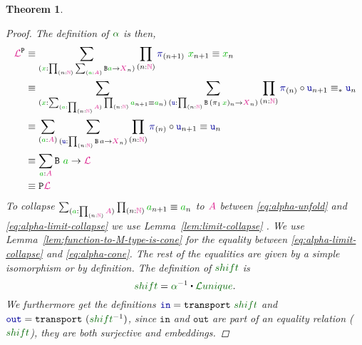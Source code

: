 \documentclass[twoside,11pt,openright]{report}
\theoremstyle{plain} %
\newtheorem{thm}{Theorem}[section]
\theoremstyle{definition}
\theoremstyle{remark}
\newcommand*{\lemref}[1]{Lemma~\ref{lem:#1}}
\newcommand*{\term}[1]{\textcolor{green!70!black}{#1}} %
\newcommand*{\pathterm}[1]{\textcolor{green!40!black}{#1}}
\newcommand*{\type}[1]{\textcolor{magenta!90!black}{#1}}
\newcommand*{\function}[1]{\textcolor{blue!60!black}{\ensuremath{\mathtt{#1}}}}
\newcommand*{\typeformer}[1]{\ensuremath{\mathtt{#1}}}
\newcommand*{\functor}[1]{\ensuremath{\mathbf{\mathtt{#1}}}}
\newcommand{\ct}{%
  \mathchoice{\mathbin{\raisebox{0.5ex}{$\displaystyle\centerdot$}}}%
             {\mathbin{\raisebox{0.5ex}{$\centerdot$}}}%
             {\mathbin{\raisebox{0.25ex}{$\scriptstyle\,\centerdot\,$}}}%
             {\mathbin{\raisebox{0.1ex}{$\scriptscriptstyle\,\centerdot\,$}}}
}
\newcommand*{\sym}[1]{\ensuremath{#1^{-1}}}
\begin{document}
\begin{thm}
\begin{proof}
    The definition of \(\pathterm{\alpha}\) is then, 
    \begin{align}
      \type{\mathcal{L}}^{\functor{P}} &\equiv \sum_{(\term{x} : \prod_{(n : \type{\mathbb{N}})} \sum_{(\term{a} : \type{A})} \typeformer{B} \term{a} \rightarrow \type{X}_n)} \prod_{(n : \type{\mathbb{N}})} \function{\pi}_{(n+1)}~\term{x}_{n+1} \equiv \term{x}_{n} \\
      &\equiv \sum_{(\term{x} : \sum_{(\term{a} : \prod_{(n : \type{\mathbb{N}})} \type{A})} \prod_{(n : \type{\mathbb{N}})} \term{a}_{n+1} \equiv \term{a}_n)} \sum_{(\function{u} : \prod_{(n : \type{\mathbb{N}})} \typeformer{B}\,(\pi_1\,\term{x})_n \rightarrow \type{X}_n)} \prod_{(n : \type{\mathbb{N}})} \function{\pi}_{(n)} \circ \function{u}_{n+1} \equiv_* \function{u}_n \label{eq:alpha-unfold} \\
      &\equiv \sum_{(\term{a} : \type{A})} \sum_{(\function{u} : \prod_{(n : \type{\mathbb{N}})} \typeformer{B}\,a \rightarrow \type{X}_n)} \prod_{(n : \type{\mathbb{N}})} \function{\pi}_{(n)} \circ \function{u}_{n+1} \equiv \function{u}_n \label{eq:alpha-limit-collapse} \\
      &\equiv \sum_{\term{a} : \type{A}} \typeformer{B}~\term{a} \rightarrow \type{\mathcal{L}} \label{eq:alpha-cone}\\
      &\equiv \functor{P}\type{\mathcal{L}}
    \end{align}
    To collapse \(\sum_{(\term{a} : \prod_{(n : \type{\mathbb{N}})} \type{A})} \prod_{(n : \type{\mathbb{N}})} \term{a}_{n+1} \equiv \term{a}_n\) to \(\type{A}\) between \eqref{eq:alpha-unfold} and \eqref{eq:alpha-limit-collapse} we use \lemref{limit-collapse} . We use \lemref{function-to-M-type-is-cone} for the equality between \eqref{eq:alpha-limit-collapse} and \eqref{eq:alpha-cone}. The rest of the equalities are given by a simple isomorphism or by definition. The definition of \(\pathterm{shift}\) is
    \begin{equation}
      \pathterm{shift} = \sym{\pathterm{\alpha}} \ct \pathterm{\mathcal{L}unique}.
    \end{equation}
    We furthermore get the definitions \(\function{in} = \mathtt{transport}~\pathterm{shift}\) and \(\function{out} = \mathtt{transport}~(\sym{\pathterm{shift}})\), since \function{in} and \function{out} are part of an equality relation (\(\pathterm{shift}\)), they are both surjective and embeddings.
    \end{proof}
\end{thm}
\end{document}
